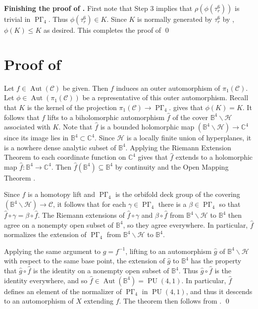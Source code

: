 \documentclass[11pt]{amsart}
\theoremstyle{plain}
\theoremstyle{definition}
\theoremstyle{remark}
\newcommand{\bbB}{\mathbb{B}}
\newcommand{\bbC}{\mathbb{C}}
\newcommand{\calC}{\mathcal{C}}
\newcommand{\calH}{\mathcal{H}}
\newcommand{\gam}{\gamma}
\DeclareMathOperator{\PU}{PU}
\DeclareMathOperator{\Aut}{Aut}
\newcommand{\ssm}{\smallsetminus}
\DeclareMathOperator{\PGam}{\mathrm{P}\Gamma}
\newcommand{\wh}{\widehat}
\begin{document}
\medskip
\noindent
\textbf{Finishing the proof of .} First note that Step 3 implies that $\rho(\phi(\tau_r^6))$ is trivial in $\PGam_4$. Thus $\phi(\tau_r^6) \in K$. Since $K$ is normally generated by $\tau_r^6$ by , $\phi(K) \le K$ as desired. This completes the proof of  \qed

\section{Proof of }\label{sec:MainProof}

Let $f \in \Aut(\calC)$ be given. Then $f$ induces an outer automorphism of $\pi_1(\calC)$. Let $\phi \in \Aut(\pi_1(\calC))$ be a representative of this outer automorphism. Recall that $K$ is the kernel of the projection $\pi_1(\calC)\to\PGam_4$.  gives that $\phi(K) = K$. It follows that $f$ lifts to a biholomorphic automorphism $\wh{f}$ of the cover ${\bbB^4 \ssm \calH}$ associated with $K$. Note that $\wh{f}$ is a bounded holomorphic map $(\bbB^4 \ssm \calH)\to \bbC^4$ since its image lies in $\bbB^4\subset\bbC^4$. Since $\calH$ is a locally finite union of hyperplanes, it is a nowhere dense analytic subset of $\bbB^4$. Applying the Riemann Extension Theorem \cite[Prop.\ 4.2]{Narasimhan} to each coordinate function on $\bbC^4$ gives that $\wh{f}$ extends to a holomorphic map $\wh{f} : \bbB^4 \to \bbC^4$. Then $\wh{f}(\bbB^4) \subseteq \bbB^4$ by continuity and the Open Mapping Theorem \cite[Prop.\ 1.4]{Narasimhan}.

Since $\wh{f}$ is a homotopy lift and $\PGam_4$ is the orbifold deck group of the covering $(\bbB^4 \ssm \calH)\to\calC$, it follows that for each $\gam \in \PGam_4$ there is a $\beta \in \PGam_4$ so that $\wh{f} \circ \gam = \beta \circ \wh{f}$. The Riemann extensions of $\wh{f} \circ \gam$ and $\beta \circ \wh{f}$ from $\bbB^4 \ssm \calH$ to $\bbB^4$ then agree on a nonempty open subset of $\bbB^4$, so they agree everywhere. In particular, $\wh{f}$ normalizes the extension of $\PGam_4$ from $\bbB^4\ssm\calH$ to $\bbB^4$. 

Applying the same argument to $g = f^{-1}$, lifting to an automorphism $\wh{g}$ of $\bbB^4 \ssm \calH$ with respect to the same base point, the extension of $\wh{g}$ to $\bbB^4$ has the property that $\wh{g} \circ \wh{f}$ is the identity on a nonempty open subset of $\bbB^4$. Thus $\wh{g} \circ \wh{f}$ is the identity everywhere, and so $\wh{f} \in \Aut(\bbB^4) = \PU(4,1)$. In particular, $\wh{f}$ defines an element of the normalizer of $\PGam_4$ in $\PU(4,1)$, and thus it descends to an automorphism of $X$ extending $f$. The theorem then follows from . \qed
\end{document}
